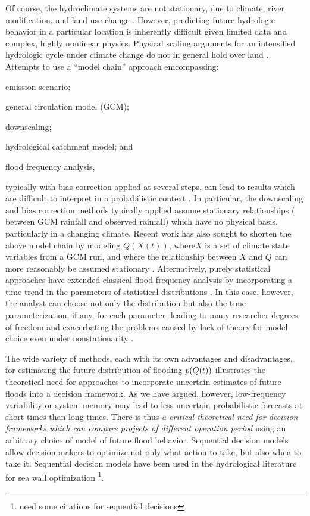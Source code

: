 \documentclass[11pt]{article}
\begin{document}
Of course, the hydroclimate systems are not stationary, due to climate, river modification, and land use change \citep{Milly2008,Merz2014}.
However, predicting future hydrologic behavior in a particular location is inherently difficult given limited data and complex, highly nonlinear physics.
Physical scaling arguments for an intensified hydrologic cycle under climate change \citep[see][]{Muller2011,OGorman2015} do not in general hold over land \citep{Byrne2015,Shaw2016}.
Attempts to use a ``model chain'' approach emcompassing:
\begin{enumerate*}[label= (\roman*) ]
  \item emission scenario;
  \item general circulation model (GCM);
  \item downscaling;
  \item hydrological catchment model; and
  \item flood frequency analysis,
\end{enumerate*}
typically with bias correction applied at several steps, can lead to results which are difficult to interpret in a probabilistic context \citep{Dankers2009,Ott2013,Merz2014,Dittes2017}.
In particular, the downscaling and bias correction methods typically applied assume stationary relationships (\eg{} between GCM rainfall and observed rainfall) which have no physical basis, particularly in a changing climate.
Recent work has also sought to shorten the above model chain by modeling \( Q(X(t)) \), where\( X \) is a set of climate state variables from a GCM run, and where the relationship between \(X\) and \(Q\) can more reasonably be assumed stationary \citep{Hall2014,Delgado2014,Silva2016}.
Alternatively, purely statistical approaches have extended classical flood frequency analysis by incorporating a time trend in the parameters of statistical distributions \citep{Obeysekera2014,Vogel2011,Serinaldi2015,Strupczewski2001}.
In this case, however, the analyst can choose not only the distribution but also  the time parameterization, if any, for each parameter, leading to many researcher degrees of freedom \citep[``forking paths'' or ``multiple comparisons'';][]{Gelman2013} and exacerbating the problems caused by lack of theory for model choice even under nonstationarity \citep{Kidson2016}.

The wide variety of methods, each with its own advantages and disadvantages, for estimating the future distribution of flooding \(p \qty(Q(t))\) illustrates the theoretical need for approaches to incorporate uncertain estimates of future floods into a decision framework.
As we have argued, however, low-frequency variability or system memory may lead to less uncertain probabilistic forecasts at short times than long times.
There is thus \emph{a critical theoretical need for decision frameworks which can compare projects of different operation period} using an arbitrary choice of model of future flood behavior.
Sequential decision models \citep[see][]{Russell2003,Howard1960} allow decision-makers to optimize not only what action to take, but also when to take it.
Sequential decision models have been used in the hydrological literature for sea wall optimization \citep{Lickley2014}\footnote{need some citations for sequential decisions}.
\end{document}
